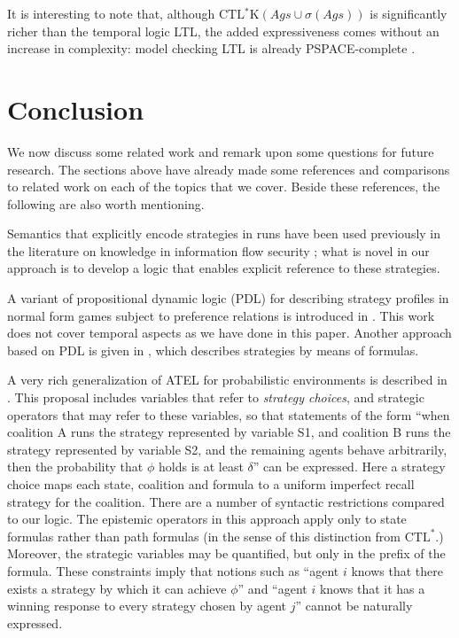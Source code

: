 \documentclass[a4wide]{article}
\newcommand{\CTL}{\mbox{CTL}}
\newcommand{\CTLsK}{\mbox{CTL$^*$K}}
\theoremstyle{examplesty}
\newcommand{\strat}{\sigma}
\newcommand{\Ags}{\mathit{Ags}}
\begin{document}
It is interesting to note that, although $\CTLsK(
\Ags 
\cup \strat(\Ags))$ is  significantly richer than the temporal logic LTL, 
the added expressiveness comes without an increase in complexity: model checking LTL is already PSPACE-complete \cite{SistlaC85}. 




\section{Conclusion}\label{sec:concl}

We now discuss some related work and remark upon some questions for future research. 
The sections above have already made some references and 
comparisons to related work on each of the  topics that we cover. 
Beside these references, the following are also worth mentioning. 


Semantics that explicitly encode strategies in runs  have been used 
previously in the literature 
on knowledge in information flow security
\cite{HalpernOneill}; what is novel in our approach is
to develop a logic that enables explicit reference  to these strategies.



A variant of propositional dynamic logic (PDL) for describing strategy profiles 
in normal form games subject to preference relations is introduced in 
\cite{vanEijck13}. This work does not cover temporal aspects as we have done 
in this paper. Another approach based on PDL is given in 
\cite{RamSimon08}, which describes strategies by means of formulas. 

A very rich generalization of ATEL for probabilistic environments is described in \cite{Schnoor10}. 
This proposal includes variables that refer to {\em strategy choices}, and  strategic operators that may 
refer to these variables, so that statements of the form ``when coalition A runs the strategy represented
by variable S1, and coalition B runs the strategy represented by variable S2, 
and the remaining agents behave arbitrarily, then the probability that $\phi$ holds
is at least $\delta$'' can be expressed. Here a strategy choice maps each 
state, coalition and formula to a uniform imperfect recall strategy for the coalition. 
There are a number of syntactic restrictions compared to our logic. 
The epistemic operators in this approach  apply only to 
state formulas rather than path formulas (in the sense of this distinction from $\CTL^*$.) 
Moreover, the strategic variables may be quantified, but only in the prefix of the formula. 
These constraints imply  that notions such as ``agent $i$ knows that there exists a strategy by which it can achieve
$\phi$'' and  ``agent $i$ knows that it has a winning response to every strategy chosen by agent $j$'' 
cannot be naturally expressed. 
\end{document}
